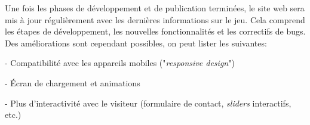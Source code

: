 Une fois les phases de développement et de publication terminées, le site web sera mis à jour régulièrement avec les dernières informations sur le jeu. Cela comprend les étapes de développement, les nouvelles fonctionnalités et les correctifs de bugs.
\\

Des améliorations sont cependant possibles, on peut lister les suivantes:

- Compatibilité avec les appareils mobiles ("\textit{responsive design}")

- Écran de chargement et animations

- Plus d'interactivité avec le visiteur (formulaire de contact, \textit{sliders} interactifs, etc.)


